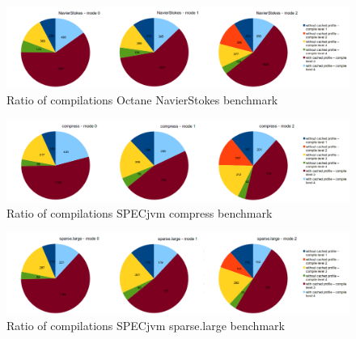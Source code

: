 \begin{figure}[ht]
  \begin{center}
    \centering
    \includegraphics[width=1.0\textwidth]{figures/navierstokes_compilations.png}
    \caption{Ratio of compilations Octane NavierStokes benchmark}
    \label{f:navierstokes_compilations}
  \end{center}
\end{figure}
\begin{figure}[ht]
  \begin{center}
    \centering
    \includegraphics[width=1.0\textwidth]{figures/compress_compilations.png}
    \caption{Ratio of compilations SPECjvm compress benchmark}
    \label{f:compress_compilations}
  \end{center}
\end{figure}
\begin{figure}[ht]
  \begin{center}
    \centering
    \includegraphics[width=1.0\textwidth]{figures/sparselarge_compilations.png}
    \caption{Ratio of compilations SPECjvm sparse.large benchmark}
    \label{f:sparselarge_compilations}
  \end{center}
\end{figure}
